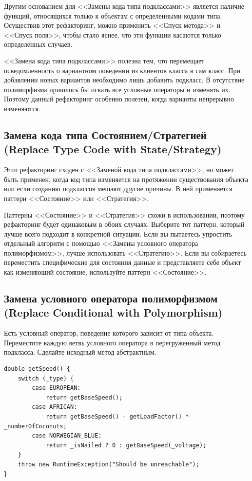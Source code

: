 \documentclass{../../text-style}
\begin{document}
Другим основанием для <<Замены кода типа подклассами>> является наличие функций, относящихся только к объектам с определенными кодами типа. Осуществив этот рефакторинг, можно применить <<Спуск метода>> и <<Спуск поля>>, чтобы стало яснее, что эти функции касаются только определенных случаев.

<<Замена кода типа подклассами>> полезна тем, что перемещает осведомленность о вариантном поведении из клиентов класса в сам класс. При добавлении новых вариантов необходимо лишь добавить подкласс. В отсутствие полиморфизма пришлось бы искать все условные операторы и изменять их. Поэтому данный рефакторинг особенно полезен, когда варианты непрерывно изменяются.

\subsection{Замена кода типа Состоянием/Стратегией (Replace Type Code with State/Strategy)}

Этот рефакторинг сходен с <<Заменой кода типа подклассами>>, но может быть применен, когда код типа изменяется на протяжении существования объекта или если созданию подклассов мешают другие причины. В ней применяется паттерн <<Состояние>> или <<Стратегия>>.

Паттерны <<Состояние>> и <<Стратегия>> схожи в использовании, поэтому рефакторинг будет одинаковым в обоих случаях. Выберите тот паттерн, который лучше всего подходит в конкретной ситуации. Если вы пытаетесь упростить отдельный алгоритм с помощью <<Замены условного оператора полиморфизмом>>, лучше использовать <<Стратегию>>. Если вы собираетесь переместить специфические для состояния данные и представляете себе объект как изменяющий состояние, используйте паттерн <<Состояние>>.

\subsection{Замена условного оператора полиморфизмом (Replace Conditional with Polymorphism)}

Есть условный оператор, поведение которого зависит от типа объекта. Переместите каждую ветвь условного оператора в перегруженный метод подкласса. Сделайте исходный метод абстрактным.

\begin{verbatim}
double getSpeed() {
    switch (_type) {
        case EUROPEAN:
            return getBaseSpeed();
        case AFRICAN:
            return getBaseSpeed() - getLoadFactor() * _numberOfCoconuts;
        case NORWEGIAN_BLUE:
            return _isNailed ? 0 : getBaseSpeed(_voltage);
    }
    throw new RuntimeException("Should be unreachable");
}
\end{verbatim}
\end{document}
